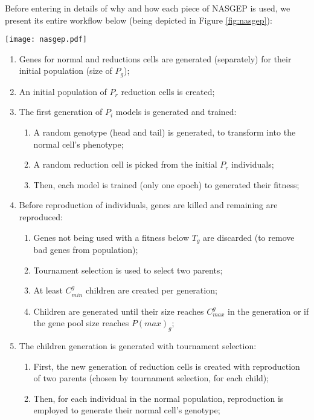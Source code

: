 \documentclass[conference]{IEEEtran}
\begin{document}
	Before entering in details of why and how each piece of NASGEP is used, we present its entire workflow below (being depicted in Figure \ref{fig:nasgep}):
	
	\begin{figure*}[hbt]
		\centering
		\texttt{[image: nasgep.pdf]}
		\caption{Overall representation of the NASGEP workflow.}
		\label{fig:nasgep}
	\end{figure*}
	
	\begin{enumerate}
		\item Genes for normal and reductions cells are generated (separately) for their initial population (size of $P_g$);
		\item An initial population of $P_r$ reduction cells is created;
		\item The first generation of $P_i$ models is generated and trained:
		\begin{enumerate}
			\item A random genotype (head and tail) is generated, to transform into the normal cell's phenotype;
			\item A random reduction cell is picked from the initial $P_r$ individuals;
			\item Then, each model is trained (only one epoch) to generated their fitness;
		\end{enumerate}
		\item Before reproduction of individuals, genes are killed and remaining are reproduced:
		\begin{enumerate}
			\item Genes not being used with a fitness below $T_g$ are discarded (to remove bad genes from population);
			\item Tournament selection is used to select two parents;
			\item At least $C^g_{min}$ children are created per generation;
			\item Children are generated until their size reaches $C^g_{max}$ in the generation or if the gene pool size reaches $P(max)_g$;
		\end{enumerate}
		\item The children generation is generated with tournament selection:
		\begin{enumerate}
			\item First, the new generation of reduction cells is created with reproduction of two parents (chosen by tournament selection, for each child);
			\item Then, for each individual in the normal population, reproduction is employed to generate their normal cell's genotype;

\end{enumerate}
\end{enumerate}
\end{document}
